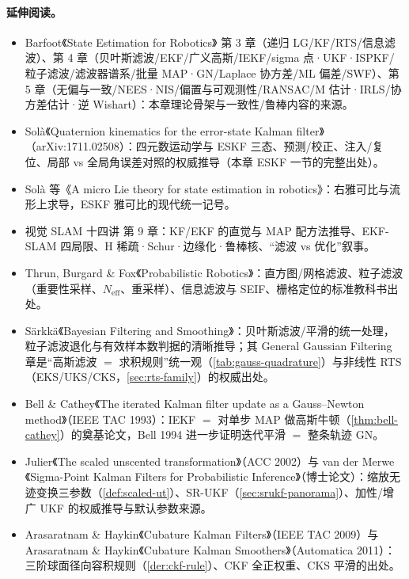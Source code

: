 \paragraph{延伸阅读。}
\begin{itemize}
  \item Barfoot《State Estimation for Robotics》\cite{barfoot2024state} 第 3 章（递归 LG/KF/RTS/信息滤波）、第 4 章（贝叶斯滤波/EKF/广义高斯/IEKF/sigma 点·UKF·ISPKF/粒子滤波/滤波器谱系/批量 MAP·GN/Laplace 协方差/ML 偏差/SWF）、第 5 章（无偏与一致/NEES·NIS/偏置与可观测性/RANSAC/M 估计·IRLS/协方差估计·逆 Wishart）：本章理论骨架与一致性/鲁棒内容的来源。
  \item Solà《Quaternion kinematics for the error-state Kalman filter》\cite{sola2017quaternion}（arXiv:1711.02508）：四元数运动学与 ESKF 三态、预测/校正、注入/复位、局部 vs 全局角误差对照的权威推导（本章 ESKF 一节的完整出处）。
  \item Solà 等《A micro Lie theory for state estimation in robotics》\cite{sola2018micro}：右雅可比与流形上求导，ESKF 雅可比的现代统一记号。
  \item 视觉 SLAM 十四讲\cite{gaoxiang2019slam14} 第 9 章：KF/EKF 的直觉与 MAP 配方法推导、EKF-SLAM 四局限、H 稀疏·Schur·边缘化·鲁棒核、“滤波 vs 优化”叙事。
  \item Thrun, Burgard \& Fox《Probabilistic Robotics》\cite{thrun2005probabilistic}：直方图/网格滤波、粒子滤波（重要性采样、$N_{\text{eff}}$、重采样）、信息滤波与 SEIF、栅格定位的标准教科书出处。
  \item Särkkä《Bayesian Filtering and Smoothing》\cite{sarkka2013bayesian}：贝叶斯滤波/平滑的统一处理，粒子滤波退化与有效样本数判据的清晰推导；其 General Gaussian Filtering 章是“高斯滤波 $=$ 求积规则”统一观（\cref{tab:gauss-quadrature}）与非线性 RTS（EKS/UKS/CKS，\cref{sec:rts-family}）的权威出处。
  \item Bell \& Cathey《The iterated Kalman filter update as a Gauss--Newton method》\cite{bell1993iterated}（IEEE TAC 1993）：IEKF $=$ 对单步 MAP 做高斯牛顿（\cref{thm:bell-cathey}）的奠基论文，Bell 1994 进一步证明迭代平滑 $=$ 整条轨迹 GN。
  \item Julier《The scaled unscented transformation》\cite{julier2002scaled}（ACC 2002）与 van der Merwe《Sigma-Point Kalman Filters for Probabilistic Inference》\cite{vandermerwe2004sigma}（博士论文）：缩放无迹变换三参数（\cref{def:scaled-ut}）、SR-UKF（\cref{sec:srukf-panorama}）、加性/增广 UKF 的权威推导与默认参数来源。
  \item Arasaratnam \& Haykin《Cubature Kalman Filters》\cite{arasaratnam2009cubature}（IEEE TAC 2009）与 Arasaratnam \& Haykin《Cubature Kalman Smoothers》\cite{arasaratnam2011smoother}（Automatica 2011）：三阶球面径向容积规则（\cref{der:ckf-rule}）、CKF 全正权重、CKS 平滑的出处。

\end{itemize}
